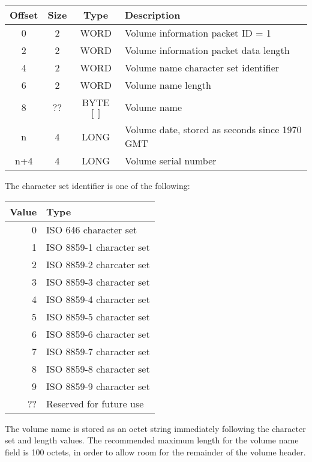 \begin{center}
\begin{tabular}{|c|c|c|l|}
\hline
    Offset & Size  &  Type   &     Description\\
\hline
       0   &   2   &  WORD   &     Volume information packet ID = 1\\
       2   &   2   &  WORD   &     Volume information packet data length\\
       4   &   2   &  WORD   &     Volume name character set identifier\\
       6   &   2   &  WORD   &     Volume name length\\
       8   &  ??   &  BYTE$[ ]$ &     Volume name\\
       n   &   4   &  LONG   &     Volume date, stored as seconds since 1970 GMT\\
     n+4   &   4   &  LONG   &     Volume serial number\\
\hline
\end{tabular}
\end{center}

The character set identifier is one of the following:

\begin{center}
\begin{tabular}{|r|l|}
\hline
    Value &  Type\\
\hline
      0   &  ISO 646 character set\\
      1   &  ISO 8859-1 character set\\
      2   &  ISO 8859-2 charcater set\\
      3   &  ISO 8859-3 character set\\
      4   &  ISO 8859-4 character set\\
      5   &  ISO 8859-5 character set\\
      6   &  ISO 8859-6 character set\\
      7   &  ISO 8859-7 character set\\
      8   &  ISO 8859-8 character set\\
      9   &  ISO 8859-9 character set\\
     ??   &  Reserved for future use\\
\hline
\end{tabular}
\end{center}

The volume name is stored as an octet string immediately following the
character set and length values.  The recommended maximum length for the volume
name field is 100 octets, in order to allow room for the remainder of the
volume header.


